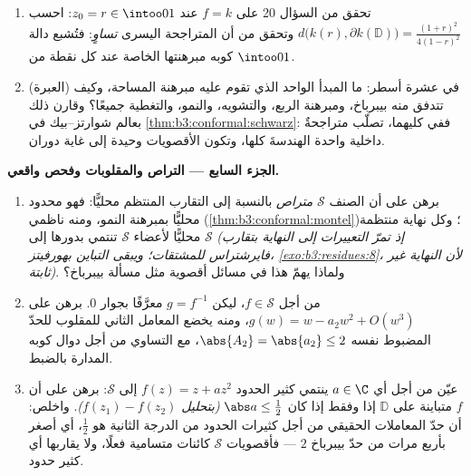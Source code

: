 \begin{problem}
\begin{enumerate}[resume]
{        $\psi^{-1}\circ\hat g$، حيث $\hat g(w) =
        f^{-1}\bigl(f(z_0) + dw\bigr)$ و $d$ المسافة و $\psi$ تشاكل ذاتي
        للقرص يرسل $0$ إلى $z_0$)}. ولماذا تكون $\partial f(\mathbb D)$ غير
        خالية؟
  \item تحقق من السؤال 20 على $f = k$ عند $z_0 = r \in
        \intoo01$: احسب $d\bigl(k(r), \partial k(\mathbb
        D)\bigr) = \frac{(1+r)^2}{4(1-r)^2}$
        وتحقق من أن المتراجحة اليسرى \emph{تساوٍ}: فتُشبع دالة
        كوبه مبرهنتها الخاصة عند كل نقطة من $\intoo01$.
  \item (العبرة) في عشرة أسطر: ما المبدأ الواحد الذي تقوم عليه
        مبرهنة المساحة، وكيف تتدفق منه بيبرباخ، ومبرهنة الربع،
        والتشويه، والنمو، والتغطية جميعًا؟ وقارن ذلك بعالم
        شوارتز--بيك في \cref{thm:b3:conformal:schwarz}: ففي كليهما، تصلّب متراجحةٌ
        داخلية واحدة الهندسةَ كلها، وتكون الأقصويات وحيدة إلى
        غاية دوران.

\end{enumerate}
\medskip
\noindent\textbf{الجزء السابع --- التراص والمقلوبات وفحص
واقعي.}
\begin{enumerate}[resume]
  \item برهن على أن الصنف $\mathcal S$ \emph{متراص} بالنسبة
        إلى التقارب المنتظم محليًّا: فهو محدود محليًّا بمبرهنة
        النمو، ومنه ناظمي (\cref{thm:b3:conformal:montel})؛ وكل نهاية منتظمة
        محليًّا لأعضاء $\mathcal S$ تنتمي بدورها إلى
        $\mathcal S$ \emph{(إذ تمرّ التعييرات إلى النهاية
        بتقارب فايرشتراس للمشتقات؛ ويبقى التباين بهورفيتز،
        \cref{exo:b3:residues:8}، لأن النهاية غير ثابتة)}. ولماذا يهمّ هذا
        في مسائل أقصوية مثل مسألة بيبرباخ؟
  \item من أجل $f \in \mathcal S$، ليكن $g = f^{-1}$ معرَّفًا بجوار $0$.
        برهن على $g(w) = w - a_2w^2 + O(w^3)$، ومنه يخضع المعامل الثاني للمقلوب
        للحدّ المضبوط نفسه $\abs{A_2} = \abs{a_2} \leq 2$، مع التساوي من أجل دوال
        كوبه المدارة بالضبط.
  \item عيّن من أجل أي $a \in \C$ ينتمي كثير الحدود $f(z)
        = z + az^2$
        إلى $\mathcal S$: برهن على أن $f$ متباينة على
        $\mathbb D$ إذا وفقط إذا كان $\abs a \leq \frac12$ \emph{(بتحليل
        $f(z_1) - f(z_2)$)}. واخلص: أن حدّ المعاملات الحقيقي من أجل
        كثيرات الحدود من الدرجة الثانية هو $\frac12$، أي أصغر
        بأربع مرات من حدّ بيبرباخ $2$ --- فأقصويات
        $\mathcal S$ كائنات متسامية فعلًا، ولا يقاربها أي كثير
        حدود.
\end{enumerate}
\end{problem}
